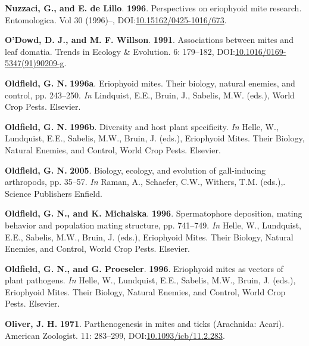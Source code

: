 \documentclass[12pt,final,CPage]{ufthesis}
\newlength{\cslhangindent}
\newenvironment{CSLReferences}[2] %
{%
	\setlength{\parindent}{0pt}
	\ifodd #1 \everypar{\setlength{\hangindent}{\cslhangindent}}\ignorespaces\fi
	\ifnum #2 > 0
	\setlength{\parskip}{#2\baselineskip}
	\fi
}%
{}
\begin{document}
{\begin{CSLReferences}{1}{0}
  \leavevmode{}%
  \textbf{Nuzzaci, G., and E. de Lillo}. \textbf{1996}. Perspectives on eriophyoid mite research. Entomologica. Vol 30 (1996)--, DOI:\href{https://doi.org/10.15162/0425-1016/673}{10.15162/0425-1016/673}.

  \leavevmode{}%
  \textbf{O'Dowd, D. J., and M. F. Willson}. \textbf{1991}. Associations between mites and leaf domatia. Trends in Ecology {\&} Evolution. 6: 179--182, DOI:\href{https://doi.org/10.1016/0169-5347(91)90209-g}{10.1016/0169-5347(91)90209-g}.

  \leavevmode{}%
  \textbf{Oldfield, G. N.} \textbf{1996a}. Eriophyoid mites. Their biology, natural enemies, and control, pp. 243--250. \emph{In} Lindquist, E.E., Bruin, J., Sabelis, M.W. (eds.), World Crop Pests. Elsevier.

  \leavevmode{}%
  \textbf{Oldfield, G. N.} \textbf{1996b}. Diversity and host plant specificity. \emph{In} Helle, W., Lundquist, E.E., Sabelis, M.W., Bruin, J. (eds.), Eriophyoid Mites. Their Biology, Natural Enemies, and Control, World Crop Pests. Elsevier.

  \leavevmode{}%
  \textbf{Oldfield, G. N.} \textbf{2005}. Biology, ecology, and evolution of gall-inducing arthropods, pp. 35--57. \emph{In} Raman, A., Schaefer, C.W., Withers, T.M. (eds.),. Science Publishers Enfield.

  \leavevmode{}%
  \textbf{Oldfield, G. N., and K. Michalska}. \textbf{1996}. Spermatophore deposition, mating behavior and population mating structure, pp. 741--749. \emph{In} Helle, W., Lundquist, E.E., Sabelis, M.W., Bruin, J. (eds.), Eriophyoid Mites. Their Biology, Natural Enemies, and Control, World Crop Pests. Elsevier.

  \leavevmode{}%
  \textbf{Oldfield, G. N., and G. Proeseler}. \textbf{1996}. Eriophyoid mites as vectors of plant pathogens. \emph{In} Helle, W., Lundquist, E.E., Sabelis, M.W., Bruin, J. (eds.), Eriophyoid Mites. Their Biology, Natural Enemies, and Control, World Crop Pests. Elsevier.

  \leavevmode{}%
  \textbf{Oliver, J. H.} \textbf{1971}. Parthenogenesis in mites and ticks ({Arachnida}: {Acari}). American Zoologist. 11: 283--299, DOI:\href{https://doi.org/10.1093/icb/11.2.283}{10.1093/icb/11.2.283}.


\end{CSLReferences}}
\end{document}
